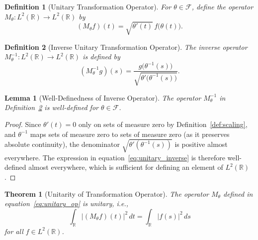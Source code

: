 \documentclass[11pt]{article}
\newtheorem{definition}{Definition}
\newtheorem{theorem}{Theorem}
\newtheorem{lemma}{Lemma}
\begin{document}
\begin{definition}[Unitary Transformation Operator]\label{def:unitary_op}
For $\theta\in\mathcal{F}$, define the operator $M_\theta\colon L^2(\mathbb{R})\to L^2(\mathbb{R})$ by
\begin{equation}\label{eq:unitary_op}
    (M_\theta f)(t) = \sqrt{\theta'(t)}\,f\bigl(\theta(t)\bigr).
\end{equation}
\end{definition}

\begin{definition}[Inverse Unitary Transformation Operator]\label{def:inverse_unitary_op}
The inverse operator $M_\theta^{-1}\colon L^2(\mathbb{R})\to L^2(\mathbb{R})$ is defined by
\begin{equation}\label{eq:unitary_inverse}
    (M_\theta^{-1} g)(s) = \frac{g\bigl(\theta^{-1}(s)\bigr)}{\sqrt{\theta'\bigl(\theta^{-1}(s)\bigr)}}.
\end{equation}
\end{definition}

\begin{lemma}[Well-Definedness of Inverse Operator]\label{lem:inverse_well_defined}
The operator $M_\theta^{-1}$ in Definition~\ref{def:inverse_unitary_op} is well-defined for $\theta\in\mathcal{F}$.
\end{lemma}

\begin{proof}
Since $\theta'(t) = 0$ only on sets of measure zero by Definition~\ref{def:scaling}, and $\theta^{-1}$ maps sets of measure zero to sets of measure zero (as it preserves absolute continuity), the denominator $\sqrt{\theta'(\theta^{-1}(s))}$ is positive almost everywhere. The expression in equation~\eqref{eq:unitary_inverse} is therefore well-defined almost everywhere, which is sufficient for defining an element of $L^2(\mathbb{R})$.
\end{proof}

\begin{theorem}[Unitarity of Transformation Operator]\label{thm:unitary}
The operator $M_\theta$ defined in equation~\eqref{eq:unitary_op} is unitary, i.e.,
\begin{equation}\label{eq:L2_preserve}
    \int_{\mathbb{R}}\lvert (M_\theta f)(t)\rvert^2\,dt
    =\int_{\mathbb{R}}\lvert f(s)\rvert^2\,ds
\end{equation}
for all $f\in L^2(\mathbb{R})$.
\end{theorem}
\end{document}
